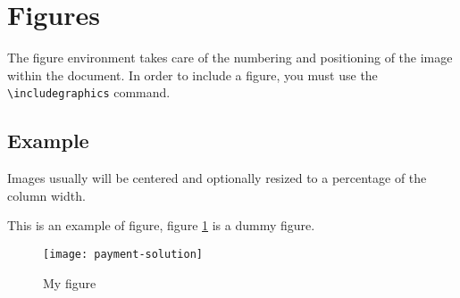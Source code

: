 \section{Figures}
The figure environment takes care of the numbering and positioning of the image within the document. In order to include a figure, you must use the \texttt{\textbackslash{}includegraphics} command. 

\subsection{Example}
Images usually will be centered and optionally resized to a percentage of the column width.

This is an example of figure, figure \ref{fig:my_figure} is a dummy figure.

\begin{figure}[hbt!]
    \centering
    \texttt{[image: payment-solution]}
    \caption{My figure}
    \label{fig:my_figure}
\end{figure}